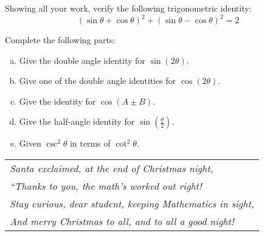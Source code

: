 \documentclass[12pt,letterpaper]{exam}
\begin{document}
\begin{questions}
Showing all your work, verify the following trigonometric identity:
	\[
	(\sin \theta + \cos \theta)^2 + (\sin \theta - \cos \theta)^2= 2
	\]



\newpage
{} \par\vspace{0.3cm}

Complete the following parts:
	\begin{enumerate}[(a)]
	\item Give the double angle identity for $\sin(2\theta)$. \vfill
	\item Give one of the double angle identities for $\cos(2\theta)$. \vfill
	\item Give the identity for $\cos(A \pm B)$. \vfill
	\item Give the half-angle identity for $\sin\!\left( \frac{\theta}{2} \right)$. \vfill
	\item Given $\csc^2 \theta$ in terms of $\cot^2 \theta$. \vfill
	\end{enumerate}

\end{questions}


\newpage

\phantom{.} \vfill
	\begin{table}[h]
	\centering
	\begin{tabular}{l}
	{\itshape Santa exclaimed, at the end of Christmas night,} \\
	{\itshape ``Thanks to you, the math's worked out right!} \\
	{\itshape Stay curious, dear student, keeping Mathematics in sight,} \\
	{\itshape And merry Christmas to all, and to all a good night!}
	\end{tabular}
	\end{table}
\phantom{.} \vfill
\end{document}
